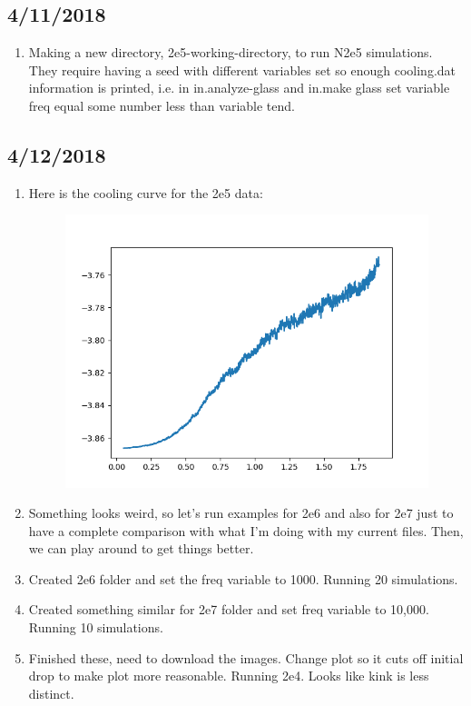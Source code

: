 \documentclass[12pt,reqno]{amsart}
\numberwithin{equation}{section}
\begin{document}
\subsection{4/11/2018}

\begin{enumerate}
\item Making a new directory, 2e5-working-directory, to run N2e5 simulations.  They require having a seed with different variables set so enough cooling.dat information is printed, i.e. in in.analyze-glass and in.make glass set variable freq equal some number less than variable tend.  
\end{enumerate}

\subsection{4/12/2018}

\begin{enumerate}
\item Here is the cooling curve for the 2e5 data:

\begin{figure}[H]
\centering
\includegraphics[scale=0.6]{average_cooling_data_N2e5}
\end{figure}

\item Something looks weird, so let's run examples for 2e6 and also for 2e7 just to have a complete comparison with what I'm doing with my current files. Then, we can play around to get things better. 
\item Created 2e6 folder and set the freq variable to 1000.  Running 20 simulations.
\item Created something similar for 2e7 folder and set freq variable to 10,000.  Running 10 simulations.  
\item Finished these, need to download the images. Change plot so it cuts off initial drop to make plot more reasonable.  Running 2e4.  Looks like kink is less distinct.  

\end{enumerate}
\end{document}
